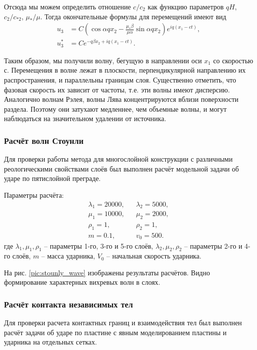 Отсюда мы можем определить отношение $c/c_2$ как функцию параметров $qH$, $c_2/c_{*2}$, $\mu_*/\mu$.  Тогда окончательные формулы для перемещений имеют вид
\begin{align}
u_3 &= C (\cos{\alpha q x_2} - \frac{\mu_* \beta}{\mu \alpha} \sin{\alpha q x_2}) e^{iq(x_1-ct)}, \nonumber\\
u_3^* &= C e^{-q \beta x_2 + i q (x_1 - ct)}.
\end{align}

Таким образом, мы получили волну, бегущую в направлении оси $x_1$ со скоростью $с$. Перемещения в волне лежат в плоскости, перпендикулярной направлению их распространения, и параллельны границам слоя. Существенно отметить, что фазовая скорость их зависит от частоты, т.е. эти волны имеют дисперсию. Аналогично волнам Рэлея, волны Лява концентрируются вблизи поверхности раздела. Поэтому они затухают медленнее, чем объемные волны, и могут наблюдаться на значительном удалении от источника.


\clearpage
\newpage

\subsubsection{Расчёт волн Стоунли}

Для проверки работы метода для многослойной конструкции с различными реологическими свойствами слоёв был выполнен расчёт модельной задачи об ударе по пятислойной преграде.

Параметры расчёта:
\begin{align}
\lambda_1=20000, & & \lambda_2=5000, \nonumber\\
\mu_1=10000, & & \mu_2=2000, \nonumber\\
\rho_1=1, & & \rho_2=1, \nonumber\\
m = 0.1, & & v_0 = 500.
\end{align}
где $\lambda_1, \mu_1, \rho_1$ -- параметры 1-го, 3-го и 5-го слоёв, $\lambda_2, \mu_2, \rho_2$ -- параметры 2-го и 4-го слоёв, $m$ -- масса ударника, $V_0$ -- начальная скорость ударника.

На рис. \ref{pic:stounly_wave} изображены результаты расчётов. Видно формирование характерных вихревых волн в слоях.


\subsubsection{Расчёт контакта независимых тел}

Для проверки расчета контактных границ и взаимодействия тел был выполнен расчёт задачи об ударе по пластине с явным моделированием пластины и ударника на отдельных сетках.


